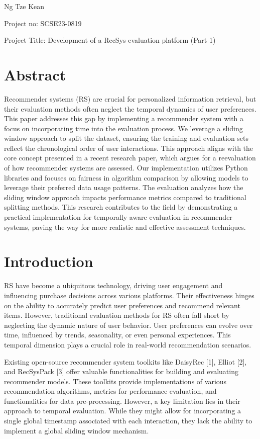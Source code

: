 \documentclass{article}
\begin{document}
Ng Tze Kean

Project no: SCSE23-0819

Project Title: Development of a RecSys evaluation platform (Part 1)

\section{Abstract}

Recommender systems (RS) are crucial for personalized information retrieval,
but their evaluation methods often neglect the temporal dynamics of user
preferences. This paper addresses this gap by implementing a recommender system
with a focus on incorporating time into the evaluation process. We leverage a
sliding window approach to split the dataset, ensuring the training and
evaluation sets reflect the chronological order of user interactions. This
approach aligns with the core concept presented in a recent research paper,
which argues for a reevaluation of how recommender systems are assessed. Our
implementation utilizes Python libraries and focuses on fairness in algorithm
comparison by allowing models to leverage their preferred data usage patterns.
The evaluation analyzes how the sliding window approach impacts performance
metrics compared to traditional splitting methods. This research contributes to
the field by demonstrating a practical implementation for temporally aware
evaluation in recommender systems, paving the way for more realistic and
effective assessment techniques.

\section{Introduction}

RS have become a ubiquitous technology, driving user engagement and influencing
purchase decisions across various platforms. Their effectiveness hinges on the
ability to accurately predict user preferences and recommend relevant items.
However, traditional evaluation methods for RS often fall short by neglecting
the dynamic nature of user behavior. User preferences can evolve over time,
influenced by trends, seasonality, or even personal experiences. This temporal
dimension plays a crucial role in real-world recommendation scenarios.

Existing open-source recommender system toolkits like DaisyRec [1], Elliot [2],
and RecSysPack [3] offer valuable functionalities for building and evaluating
recommender models. These toolkits provide implementations of various
recommendation algorithms, metrics for performance evaluation, and
functionalities for data pre-processing. However, a key limitation lies in
their approach to temporal evaluation. While they might allow for incorporating
a single global timestamp associated with each interaction, they lack the
ability to implement a global sliding window mechanism.
\end{document}
